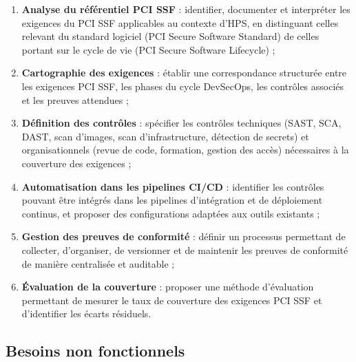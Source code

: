\begin{enumerate}
    \item \textbf{Analyse du référentiel PCI SSF} : identifier, documenter et interpréter les exigences du PCI SSF applicables au contexte d'HPS, en distinguant celles relevant du standard logiciel (PCI Secure Software Standard) de celles portant sur le cycle de vie (PCI Secure Software Lifecycle) ;
    \item \textbf{Cartographie des exigences} : établir une correspondance structurée entre les exigences PCI SSF, les phases du cycle DevSecOps, les contrôles associés et les preuves attendues ;
    \item \textbf{Définition des contrôles} : spécifier les contrôles techniques (SAST, SCA, DAST, scan d'images, scan d'infrastructure, détection de secrets) et organisationnels (revue de code, formation, gestion des accès) nécessaires à la couverture des exigences ;
    \item \textbf{Automatisation dans les pipelines CI/CD} : identifier les contrôles pouvant être intégrés dans les pipelines d'intégration et de déploiement continus, et proposer des configurations adaptées aux outils existants ;
    \item \textbf{Gestion des preuves de conformité} : définir un processus permettant de collecter, d'organiser, de versionner et de maintenir les preuves de conformité de manière centralisée et auditable ;
    \item \textbf{Évaluation de la couverture} : proposer une méthode d'évaluation permettant de mesurer le taux de couverture des exigences PCI SSF et d'identifier les écarts résiduels.
\end{enumerate}

\subsection{Besoins non fonctionnels}

